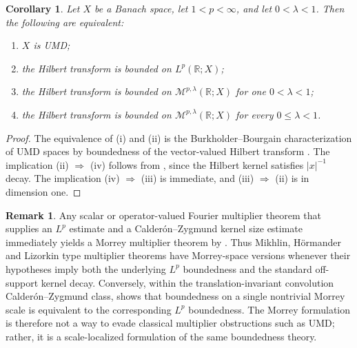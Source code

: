 \documentclass[11pt]{article}
\newtheorem{corollary}[theorem]{Corollary}
\theoremstyle{definition}
\newtheorem{remark}[theorem]{Remark}
\newcommand{\R}{\mathbb R}
\begin{document}
	\begin{corollary}\label{cor:morrey-hilbert-umd}
		Let $X$ be a Banach space, let $1<p<\infty$, and let $0<\lambda<1$.  Then the following are equivalent:
		\begin{enumerate}[label=\textup{(\roman*)}]
			\item $X$ is UMD;
			\item the Hilbert transform is bounded on $L^p(\R;X)$;
			\item the Hilbert transform is bounded on $\mathcal M^{p,\lambda}(\R;X)$ for one $0<\lambda<1$;
			\item the Hilbert transform is bounded on $\mathcal M^{p,\lambda}(\R;X)$ for every $0\le\lambda<1$.
		\end{enumerate}
	\end{corollary}

	\begin{proof}
		The equivalence of \textup{(i)} and \textup{(ii)} is the Burkholder--Bourgain characterization of UMD spaces by boundedness of the vector-valued Hilbert transform \cite{Burkholder1983,Bourgain1983}.  The implication \textup{(ii)} $\Rightarrow$ \textup{(iv)} follows from , since the Hilbert kernel satisfies $|x|^{-1}$ decay.  The implication \textup{(iv)} $\Rightarrow$ \textup{(iii)} is immediate, and \textup{(iii)} $\Rightarrow$ \textup{(ii)} is  in dimension one.
	\end{proof}

	\begin{remark}\label{rem:mihlin-hormander-lizorkin-morrey}
		Any scalar or operator-valued Fourier multiplier theorem that supplies an $L^p$ estimate and a Calder\'on--Zygmund kernel size estimate immediately yields a Morrey multiplier theorem by .  Thus Mikhlin, H\"ormander and Lizorkin type multiplier theorems have Morrey-space versions whenever their hypotheses imply both the underlying $L^p$ boundedness and the standard off-support kernel decay.  Conversely, within the translation-invariant convolution Calder\'on--Zygmund class,  shows that boundedness on a single nontrivial Morrey scale is equivalent to the corresponding $L^p$ boundedness.  The Morrey formulation is therefore not a way to evade classical multiplier obstructions such as UMD; rather, it is a scale-localized formulation of the same boundedness theory.
	\end{remark}
\end{document}
